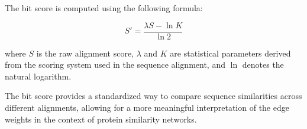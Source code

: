 The bit score is computed using the following formula:

\[
S' = \frac{\lambda S - \ln K}{\ln 2}
\]

where \(S\) is the raw alignment score, \(\lambda\) and \(K\) 
are statistical parameters derived from the scoring system used in the sequence alignment,
and \(\ln\) denotes the natural logarithm.

The bit score provides a standardized way to compare sequence 
similarities across different alignments, allowing for a more 
meaningful interpretation of the edge weights in the 
context of protein similarity networks.

